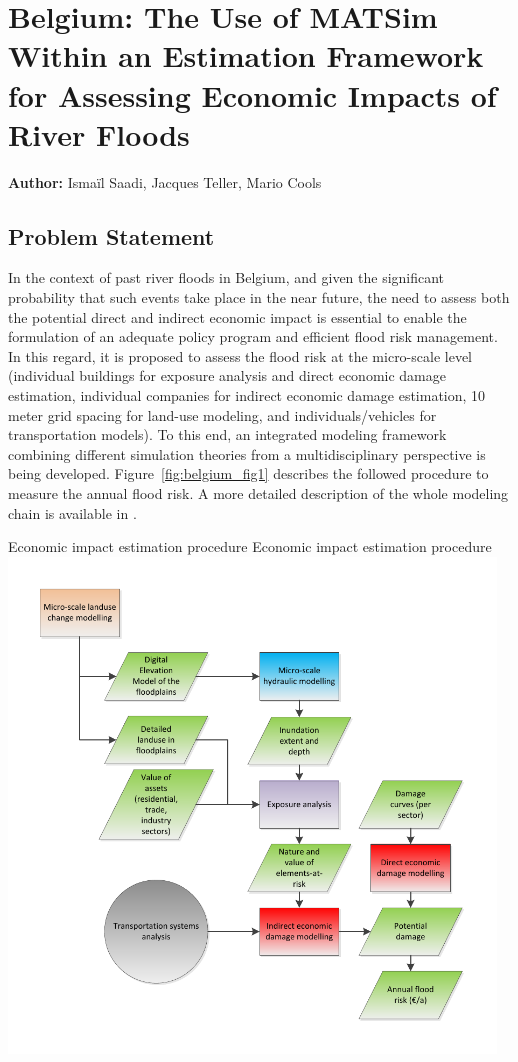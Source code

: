 \chapter{Belgium: The Use of MATSim Within an Estimation Framework for Assessing Economic Impacts of River Floods}
\label{ch:belgium}
\hfill \textbf{Author:} Ismaïl Saadi, Jacques Teller, Mario Cools

\section{Problem Statement}
In the context of past river floods in Belgium, and given the significant probability that such events take place in the near future, the need to assess both the potential direct and indirect economic impact is essential to enable the formulation of an adequate policy program and efficient flood risk management. 
In this regard, it is proposed to assess the flood risk  at the micro-scale level (\ie individual buildings for exposure analysis and direct economic damage estimation, individual companies for indirect economic damage estimation, 10\,meter grid spacing for land-use modeling, and individuals/vehicles for transportation models). 
To this end, an integrated modeling framework combining different simulation theories from a multidisciplinary perspective is being developed. 
Figure~\ref{fig:belgium_fig1} describes the followed procedure to measure the annual flood risk. 
A more detailed description of the whole modeling chain is available in \citet[][]{DewalsEtAl_IAHR_2015}.

\createfigure%
{Economic impact estimation procedure}%
{Economic impact estimation procedure}%
{\label{fig:belgium_fig1}}%
{\includegraphics[width=0.97\textwidth, angle=0]{scenarios/figures/belgium_fig1.pdf}}%
{}

